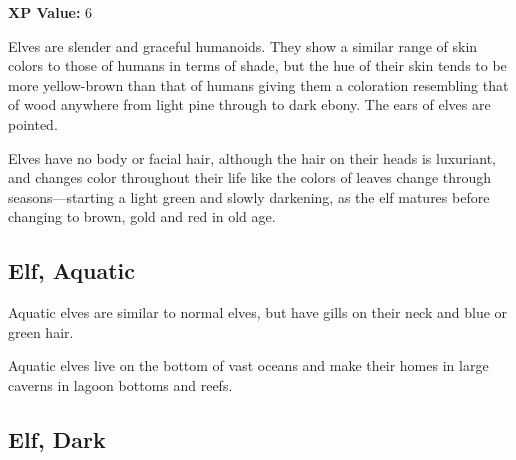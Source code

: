 \begin{multicols*}{2}
{\textbf{XP Value:} 6}

Elves are slender and graceful humanoids. They show a similar range of skin colors to those of humans in terms of shade, but the hue of their skin tends to be more yellow-brown than that of humans giving them a coloration resembling that of wood anywhere from light pine through to dark ebony. The ears of elves are pointed.

Elves have no body or facial hair, although the hair on their heads is luxuriant, and changes color throughout their life like the colors of leaves change through seasons—starting a light green and slowly darkening, as the elf matures before changing to brown, gold and red in old age.

\subsection{Elf, Aquatic}

Aquatic elves are similar to normal elves, but have gills on their neck and blue or green hair.

Aquatic elves live on the bottom of vast oceans and make their homes in large caverns in lagoon bottoms and reefs.

\subsection{Elf, Dark}
\end{multicols*}
